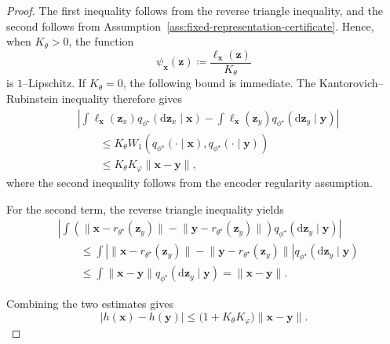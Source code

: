 \documentclass[10pt,a4paper]{amsart}
\begin{document}
\begin{proof}
The first inequality follows from the reverse triangle inequality, and the second follows from Assumption~\ref{ass:fixed-representation-certificate}. Hence, when $K_\theta>0$, the function
\[
  \psi_{\mathbf{x}}(\mathbf{z})
  \coloneqq
  \frac{\ell_{\mathbf{x}}(\mathbf{z})}{K_\theta}
\]
is $1$--Lipschitz. If $K_\theta=0$, the following bound is immediate. The Kantorovich--Rubinstein inequality therefore gives
\begin{align*}
&
\left|
\int
  \ell_{\mathbf{x}}(\mathbf{z}_x)
  q_{\phi^\star}
    (\mathrm{d}\mathbf{z}_x\mid\mathbf{x})
-
\int
  \ell_{\mathbf{x}}(\mathbf{z}_y)
  q_{\phi^\star}
    (\mathrm{d}\mathbf{z}_y\mid\mathbf{y})
\right|
\\
&\qquad\leq
K_\theta
W_1\!\left(
  q_{\phi^\star}(\cdot\mid\mathbf{x}),
  q_{\phi^\star}(\cdot\mid\mathbf{y})
\right)
\\
&\qquad\leq
K_\theta K_\varphi
\bigl\|\mathbf{x}-\mathbf{y}\bigr\|,
\end{align*}
where the second inequality follows from the encoder regularity assumption.

For the second term, the reverse triangle inequality yields
\begin{align*}
&
\left|
\int
  \left(
    \bigl\|\mathbf{x}-r_{\theta^\star}(\mathbf{z}_y)\bigr\|
    -
    \bigl\|\mathbf{y}-r_{\theta^\star}(\mathbf{z}_y)\bigr\|
  \right)
  q_{\phi^\star}
    (\mathrm{d}\mathbf{z}_y\mid\mathbf{y})
\right|
\\
&\qquad\leq
\int
\left|
  \bigl\|\mathbf{x}-r_{\theta^\star}(\mathbf{z}_y)\bigr\|
  -
  \bigl\|\mathbf{y}-r_{\theta^\star}(\mathbf{z}_y)\bigr\|
\right|
q_{\phi^\star}
  (\mathrm{d}\mathbf{z}_y\mid\mathbf{y})
\\
&\qquad\leq
\int
  \bigl\|\mathbf{x}-\mathbf{y}\bigr\|
  q_{\phi^\star}
    (\mathrm{d}\mathbf{z}_y\mid\mathbf{y})
=
\bigl\|\mathbf{x}-\mathbf{y}\bigr\|.
\end{align*}

Combining the two estimates gives
\begin{equation*}
  \bigl|h(\mathbf{x})-h(\mathbf{y})\bigr|
  \leq
  \bigl(1+K_\theta K_\varphi\bigr)
  \bigl\|\mathbf{x}-\mathbf{y}\bigr\|.
  \label{eq:h-lipschitz}
\end{equation*}


\end{proof}
\end{document}

